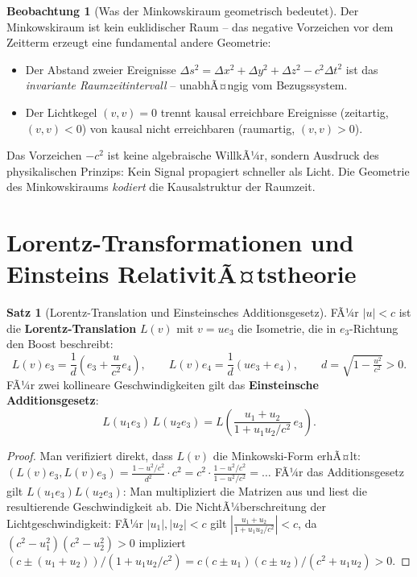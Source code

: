 ﻿\documentclass[a4paper,12pt]{report}
\theoremstyle{definition}
\newtheorem{satz}{Satz}
\newtheorem{beobachtung}{Beobachtung}
\begin{document}
\begin{beobachtung}[Was der Minkowskiraum geometrisch bedeutet]
    Der Minkowskiraum ist kein euklidischer Raum -- das negative Vorzeichen
    vor dem Zeitterm erzeugt eine fundamental andere Geometrie:
    \begin{itemize}
        \item[-] Der Abstand zweier Ereignisse $\Delta s^2 = \Delta x^2 +
              \Delta y^2 + \Delta z^2 - c^2 \Delta t^2$ ist das
              \emph{invariante Raumzeitintervall} -- unabhÃ¤ngig vom
              Bezugssystem.
        \item[-] Der Lichtkegel $(v,v) = 0$ trennt kausal erreichbare
              Ereignisse (zeitartig, $(v,v) < 0$) von kausal nicht
              erreichbaren (raumartig, $(v,v) > 0$).
    \end{itemize}
    Das Vorzeichen $-c^2$ ist keine algebraische WillkÃ¼r, sondern
    Ausdruck des physikalischen Prinzips: Kein Signal propagiert
    schneller als Licht. Die Geometrie des Minkowskiraums \emph{kodiert}
    die Kausalstruktur der Raumzeit.
\end{beobachtung}

\section{Lorentz-Transformationen und Einsteins RelativitÃ¤tstheorie}

\begin{satz}[Lorentz-Translation und Einsteinsches Additionsgesetz]
    FÃ¼r $|u| < c$ ist die \textbf{Lorentz-Translation} $L(v)$ mit
    $v = u e_3$ die Isometrie, die in $e_3$-Richtung den Boost beschreibt:
    \[
        L(v) e_3 = \frac{1}{d}\!\left(e_3 + \frac{u}{c^2} e_4\right),
        \qquad
        L(v) e_4 = \frac{1}{d}(u e_3 + e_4),
        \qquad d = \sqrt{1 - \tfrac{u^2}{c^2}} > 0.
    \]
    FÃ¼r zwei kollineare Geschwindigkeiten gilt das
    \textbf{Einsteinsche Additionsgesetz}:
    \[
        L(u_1 e_3)\, L(u_2 e_3) = L\!\left(\frac{u_1 + u_2}{1 + u_1 u_2 / c^2}\, e_3\right).
    \]
\end{satz}
\begin{proof}
    Man verifiziert direkt, dass $L(v)$ die Minkowski-Form erhÃ¤lt:
    $(L(v)e_3, L(v)e_3) = \tfrac{1-u^2/c^2}{d^2} \cdot c^2
    = c^2 \cdot \tfrac{1-u^2/c^2}{1-u^2/c^2} = \ldots$
    FÃ¼r das Additionsgesetz gilt $L(u_1 e_3) L(u_2 e_3)$: Man multipliziert
    die Matrizen aus und liest die resultierende Geschwindigkeit ab.
    Die NichtÃ¼berschreitung der Lichtgeschwindigkeit: FÃ¼r $|u_1|, |u_2| < c$ gilt
    $\left|\frac{u_1+u_2}{1+u_1u_2/c^2}\right| < c$, da
    $(c^2 - u_1^2)(c^2 - u_2^2) > 0$ impliziert $(c \pm (u_1+u_2))/(1+u_1u_2/c^2)
    = c(c \pm u_1)(c \pm u_2)/(c^2 + u_1 u_2) > 0$.
\end{proof}
\end{document}
